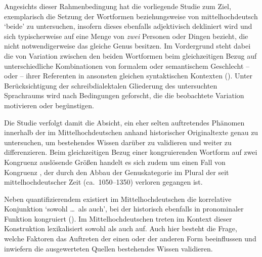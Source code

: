 Angesichts dieser Rahmenbedingung hat die vorliegende Studie zum
Ziel, exemplarisch die Setzung der Wortformen  beziehungsweise
 von mittelhochdeutsch  `beide'
zu untersuchen, insofern dieses ebenfalls adjektivisch
dekliniert wird und sich typischerweise auf eine Menge
von \emph{zwei} Personen oder Dingen bezieht, die nicht notwendigerweise das
gleiche Genus besitzen. Im Vordergrund steht dabei die  von
Variation zwischen den beiden Wortformen beim gleichzeitigen Bezug auf
unterschiedliche Kombinationen von formalem oder semantischem Geschlecht --
 oder  -- ihrer Referenten in ansonsten gleichen
syntaktischen Kontexten (). Unter Berücksichtigung der
schreibdialektalen Gliederung des untersuchten
Sprachraums wird nach Bedingungen geforscht,
die die beobachtete Variation motivieren oder begünstigen.

Die Studie verfolgt damit die Absicht, ein eher selten auftretendes Phänomen
innerhalb der  im Mittelhochdeutschen
anhand historischer Originaltexte genau zu untersuchen, um bestehendes Wissen
darüber zu validieren und weiter zu differenzieren. Beim gleichzeitigen Bezug
einer kongruierenden Wortform auf zwei Kongruenz auslösende Größen handelt es
sich zudem um einen  Fall von
Kongruenz \autocite[8--27,
59--60]{corbett2006}, der durch den Abbau der Genuskategorie im Plural der
 seit mittelhochdeutscher Zeit
(ca.\ 1050--1350) verloren gegangen ist.

Neben quantifizierendem  existiert im
Mittelhochdeutschen die korrelative Konjunktion
 `sowohl \dots\ als auch', bei der 
historisch ebenfalls in pronominaler Funktion kongruiert
(). Im Mittelhochdeutschen
treten im Kontext dieser Konstruktion lexikalisiert sowohl
 als auch  auf. Auch hier besteht die Frage, welche
Faktoren das Auftreten der einen oder der anderen Form beeinflussen und
inwiefern die ausgewerteten Quellen bestehendes Wissen validieren.


